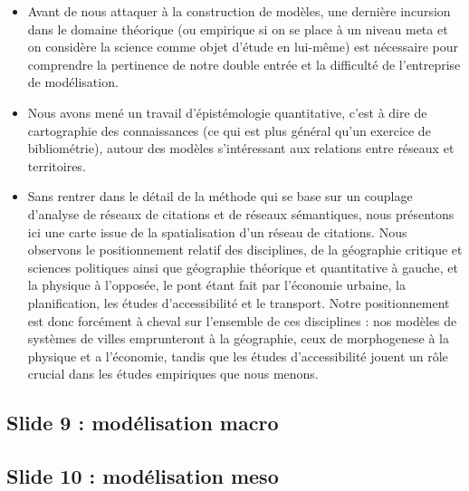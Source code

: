 \documentclass[11pt]{article}
\begin{document}
\begin{itemize}
	\item Avant de nous attaquer à la construction de modèles, une dernière incursion dans le domaine théorique (ou empirique si on se place à un niveau meta et on considère la science comme objet d'étude en lui-même) est nécessaire pour comprendre la pertinence de notre double entrée et la difficulté de l'entreprise de modélisation.
	\item Nous avons mené un travail d'épistémologie quantitative, c'est à dire de cartographie des connaissances (ce qui est plus général qu'un exercice de bibliométrie), autour des modèles s'intéressant aux relations entre réseaux et territoires.
	\item Sans rentrer dans le détail de la méthode qui se base sur un couplage d'analyse de réseaux de citations et de réseaux sémantiques, nous présentons ici une carte issue de la spatialisation d'un réseau de citations. Nous observons le positionnement relatif des disciplines, de la géographie critique et sciences politiques ainsi que géographie théorique et quantitative à gauche, et la physique à l'opposée, le pont étant fait par l'économie urbaine, la planification, les études d'accessibilité et le transport. Notre positionnement est donc forcément à cheval sur l'ensemble de ces disciplines : nos modèles de systèmes de villes emprunteront à la géographie, ceux de morphogenese à la physique et a l'économie, tandis que les études d'accessibilité jouent un rôle crucial dans les études empiriques que nous menons.
\end{itemize}




\subsection*{Slide 9 : modélisation macro}









\subsection*{Slide 10 : modélisation meso}
\end{document}
